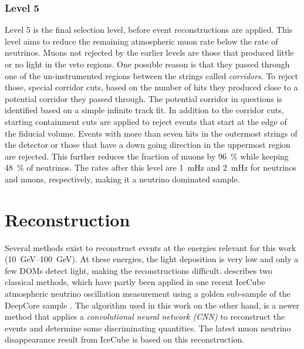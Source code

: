 

\subsubsection{Level 5} 

Level 5 is the final selection level, before event reconstructions are applied. This level aims to reduce the remaining atmospheric muon rate below the rate of neutrinos. Muons not rejected by the earlier levels are those that produced little or no light in the veto regions. One possible reason is that they passed through one of the un-instrumented regions between the strings  called \textit{corridors}. To reject those, special corridor cuts, based on the number of hits they produced close to a potential corridor they passed through. The potential corridor in questions is identified based on a simple infinite track fit. In addition to the corridor cuts, starting containment cuts are applied to reject events that start at the edge of the fiducial volume. Events with more than seven hits in the outermost strings of the detector or those that have a down going direction in the uppermost region are rejected. This further reduces the fraction of muons by \SI{96}{\percent} while keeping \SI{48}{\percent} of neutrinos. The rates after this level are \SI{1}{\milli\hertz} and \SI{2}{\milli\hertz} for neutrinos and muons, respectively, making it a neutrino dominated sample.



\section{Reconstruction} 

Several methods exist to reconstruct events at the energies relevant for this work (\SIrange{10}{100}{\giga\electronvolt}). At these energies, the light deposition is very low and only a few DOMs detect light, making the reconstructions difficult.  describes two classical methods, which have partly been applied in one recent IceCube atmospheric neutrino oscillation measurement using a golden sub-sample of the DeepCore sample . The algorithm used in this work on the other hand, is a newer method that applies a \textit{convolutional neural network (CNN)} to reconstruct the events and determine some discriminating quantities. The latest muon neutrino disappearance result from IceCube  is based on this reconstruction.


